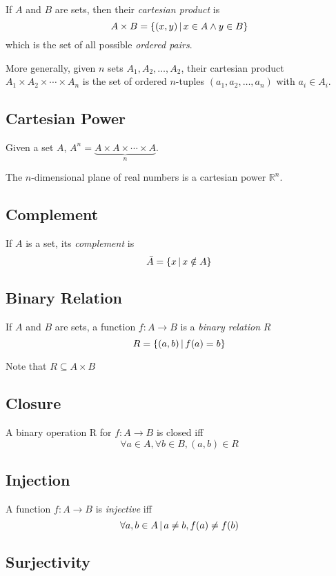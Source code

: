 \documentclass{article}
\begin{document}
If \(A\) and \(B\) are sets, then their \textit{cartesian product} is
\[
    A\times B = \{(x,y) \,|\, x \in A \land y \in B\}
\]
which is the set of all possible \textit{ordered pairs}.

More generally, given \(n\) sets \(A_1, A_2, \ldots, A_2\),
their cartesian product \(A_1 \times A_2 \times \cdots \times A_n\)
is the set of ordered \(n\)-tuples \((a_1, a_2, \ldots, a_n)\) with \(a_i\in A_i\).

\subsection{Cartesian Power}

Given a set \(A\), \(A^n=\underbrace{A\times A\times \cdots \times A}_n\).

The \(n\)-dimensional plane of real numbers is a cartesian power \({\mathbb{R}}^n\).

\subsection{Complement}

If \(A\) is a set, its \textit{complement} is
\[
    \bar{A} = \{x \,|\, x \notin A\}
\]

\subsection{Binary Relation}

If \(A\) and \(B\) are sets, a function \(f:A\to B\)
is a \textit{binary relation} \(R\)
\[
    R = \{(a,b) \,|\, f(a)=b\}
\]

Note that \(R\subseteq A\times B\)

\subsection{Closure}

A binary operation R for \(f:A\to B\) is closed iff
\[
    \forall a \in A, \forall b \in B,
    (a,b) \in R
\]

\subsection{Injection}

A function \(f:A\to B\) is \textit{injective} iff
\[
    \forall a,b \in A \,|\, a\neq b, f(a)\neq f(b)
\]

\subsection{Surjectivity}
\end{document}
